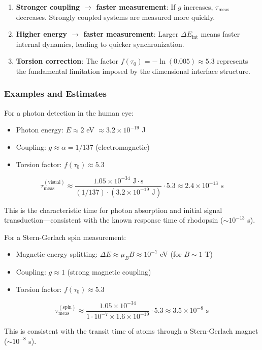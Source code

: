 \begin{enumerate}
    \item \textbf{Stronger coupling $\to$ faster measurement}: If $g$ increases, $\tau_{\text{meas}}$ decreases. Strongly coupled systems are measured more quickly.
    
    \item \textbf{Higher energy $\to$ faster measurement}: Larger $\Delta E_{\text{int}}$ means faster internal dynamics, leading to quicker synchronization.
    
    \item \textbf{Torsion correction}: The factor $f(\tau_0) = -\ln(0.005) \approx 5.3$ represents the fundamental limitation imposed by the dimensional interface structure.
\end{enumerate}

\subsubsection{Examples and Estimates}

\begin{example}
For a photon detection in the human eye:
\begin{itemize}
    \item Photon energy: $E \approx 2$ eV $\approx 3.2 \times 10^{-19}$ J
    \item Coupling: $g \approx \alpha = 1/137$ (electromagnetic)
    \item Torsion factor: $f(\tau_0) \approx 5.3$
\end{itemize}

\begin{equation}
    \tau_{\text{meas}}^{(\text{visual})} \approx \frac{1.05 \times 10^{-34} \text{ J}\cdot\text{s}}{(1/137) \cdot (3.2 \times 10^{-19} \text{ J})} \cdot 5.3 \approx 2.4 \times 10^{-13} \text{ s}
\end{equation}

This is the characteristic time for photon absorption and initial signal transduction—consistent with the known response time of rhodopsin ($\sim 10^{-13}$ s).
\end{example}

\begin{example}
For a Stern-Gerlach spin measurement:
\begin{itemize}
    \item Magnetic energy splitting: $\Delta E \approx \mu_B B \approx 10^{-7}$ eV (for $B \sim 1$ T)
    \item Coupling: $g \approx 1$ (strong magnetic coupling)
    \item Torsion factor: $f(\tau_0) \approx 5.3$
\end{itemize}

\begin{equation}
    \tau_{\text{meas}}^{(\text{spin})} \approx \frac{1.05 \times 10^{-34}}{1 \cdot 10^{-7} \times 1.6 \times 10^{-19}} \cdot 5.3 \approx 3.5 \times 10^{-8} \text{ s}
\end{equation}

This is consistent with the transit time of atoms through a Stern-Gerlach magnet ($\sim 10^{-8}$ s).
\end{example}

